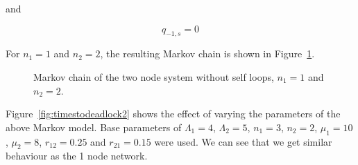 \documentclass{article}
\begin{document}
and

\begin{equation}
  q_{-1, s} = 0
\end{equation}

For $n_1 = 1$ and $n_2 = 2$, the resulting Markov chain is shown in Figure~\ref{fig:2nodeMC}.

\begin{figure}[!htbp]
    
    \caption{Markov chain of the two node system without self loops, $n_1=1$ and $n_2=2$.}
    \label{fig:2nodeMC}
\end{figure}

Figure~\ref{fig:timestodeadlock2} shows the effect of varying the parameters of the above Markov model.
Base parameters of $\Lambda_1 = 4$, $\Lambda_2 = 5$, $n_1 = 3$, $n_2 = 2$, $\mu_1 = 10$, $\mu_2 = 8$, $r_{12} = 0.25$ and $r_{21} = 0.15$ were used.
We can see that we get similar behaviour as the 1 node network.
\end{document}
